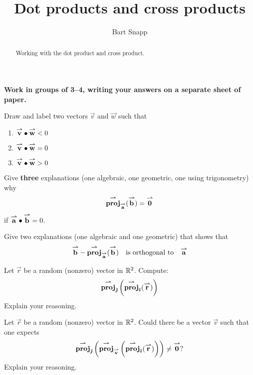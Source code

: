 \documentclass[nooutcomes,handout]{ximera}
\author{Bart Snapp}
\title[Collaborate:]{Dot products and cross products}
\begin{document}
\begin{abstract}
  Working with the dot product and cross product. 
\end{abstract}
\maketitle

\textbf{Work in groups of 3--4, writing your answers on a separate
  sheet of paper.}

\begin{problem}
  Draw and label two vectors $\vec{v}$ and $\vec{w}$ such that
  \begin{multicols}{3}
  \begin{enumerate}
  \item $\vec{v}\dotp\vec{w} <0$
  \item $\vec{v}\dotp\vec{w} =0$
  \item $\vec{v}\dotp\vec{w} >0$
  \end{enumerate}
  \end{multicols}
\end{problem}

\begin{problem}
  Give \textbf{three} explanations (one algebraic, one geometric, one
  using trigonometry) why
  \[
  \proj_{\vec{a}}(\vec{b}) = \vec{0}
  \]
  if $\vec{a}\dotp\vec{b} = 0$.
\end{problem}

\begin{problem}
  Give two explanations (one algebraic and one geometric) that shows
  that
  \[
  \vec{b} - \proj_{\vec{a}}(\vec{b}) \quad\text{is orthogonal to}\quad \vec{a}
  \]
\end{problem}


\begin{problem}
  Let $\vec{r}$ be a random (nonzero) vector in $\R^2$. Compute:
  \[
  \proj_\vecj\left(\proj_\veci(\vec{r})\right)
  \]
  Explain your reasoning.
\end{problem}

\begin{problem}
  Let $\vec{r}$ be a random (nonzero) vector in $\R^2$. Could there be
  a vector $\vec{v}$ such that one expects
  \[
  \proj_\vecj\left(\proj_{\vec{v}}\left(\proj_\veci(\vec{r})\right)\right)\ne \vec{0}?
  \]
  Explain your reasoning.
\end{problem}
\end{document}

